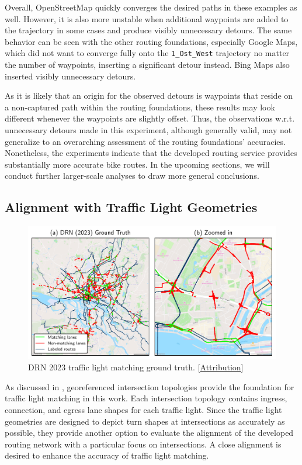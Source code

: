 Overall, OpenStreetMap quickly converges the desired paths in these examples as well. However, it is also more unstable when additional waypoints are added to the trajectory in some cases and produce visibly unnecessary detours. The same behavior can be seen with the other routing foundations, especially Google Maps, which did not want to converge fully onto the \texttt{1\_Ost\_West} trajectory no matter the number of waypoints, inserting a significant detour instead. Bing Maps also inserted visibly unnecessary detours. 

As it is likely that an origin for the observed detours is waypoints that reside on a non-captured path within the routing foundations, these results may look different whenever the waypoints are slightly offset. Thus, the observations w.r.t. unnecessary detours made in this experiment, although generally valid, may not generalize to an overarching assessment of the routing foundations' accuracies. Nonetheless, the experiments indicate that the developed routing service provides substantially more accurate bike routes. In the upcoming sections, we will conduct further larger-scale analyses to draw more general conclusions.

\subsection{Alignment with Traffic Light Geometries}

\begin{figure}[t]
\centering 
\includegraphics[width=\linewidth]{images/matching-ground-truth-drn.pdf}
\caption{DRN 2023 traffic light matching ground truth. [\hyperref[attribution]{Attribution}]}
\label{fig:matching-ground-truth-drn}
\end{figure}

As discussed in , georeferenced intersection topologies provide the foundation for traffic light matching in this work. Each intersection topology contains ingress, connection, and egress lane shapes for each traffic light. Since the traffic light geometries are designed to depict turn shapes at intersections as accurately as possible, they provide another option to evaluate the alignment of the developed routing network with a particular focus on intersections. A close alignment is desired to enhance the accuracy of traffic light matching.

